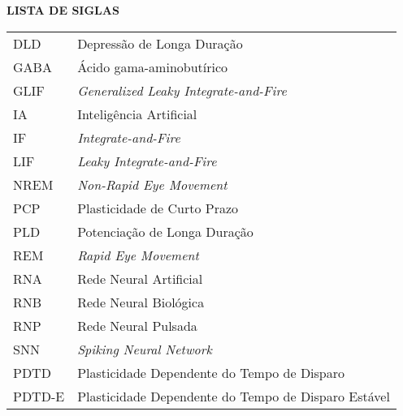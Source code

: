 \begin{center}
\textbf{LISTA DE SIGLAS}
\end{center}
\vspace*{0.5cm}
\begin{tabular}{ll}
DLD & Depressão de Longa Duração \\
GABA & Ácido gama-aminobutírico \\
GLIF & \textit{Generalized Leaky Integrate-and-Fire} \\
IA & Inteligência Artificial \\
IF & \textit{Integrate-and-Fire} \\
LIF & \textit{Leaky Integrate-and-Fire} \\
NREM & \textit{Non-Rapid Eye Movement} \\
PCP & Plasticidade de Curto Prazo \\
PLD & Potenciação de Longa Duração \\
REM & \textit{Rapid Eye Movement} \\
RNA & Rede Neural Artificial \\
RNB & Rede Neural Biológica \\
RNP & Rede Neural Pulsada \\
SNN & \textit{Spiking Neural Network} \\
PDTD & Plasticidade Dependente do Tempo de Disparo \\
PDTD-E & Plasticidade Dependente do Tempo de Disparo Estável \\

\end{tabular}
\addtocounter{table}{0}